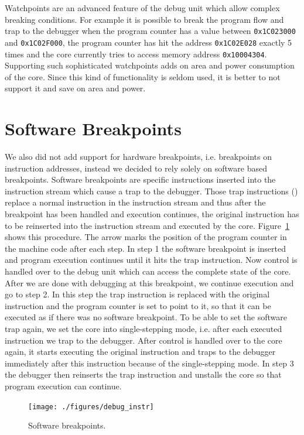 Watchpoints are an advanced feature of the debug unit which allow complex
breaking conditions. For example it is possible to break the program flow and
trap to the debugger when the program counter has a value between \texttt{0x1C023000} and
\texttt{0x1C02F000}, the program counter has hit the address \texttt{0x1C02E028}
exactly 5 times and the core currently tries to access memory address
\texttt{0x10004304}.
Supporting such sophisticated watchpoints adds on area and power consumption of
the core. Since this kind of functionality is seldom used, it is better to not
support it and save on area and power.


\section{Software Breakpoints}

We also did not add support for hardware breakpoints, i.e. breakpoints on
instruction addresses, instead we decided to rely solely on software based
breakpoints. Software breakpoints are specific instructions inserted into the
instruction stream which cause a trap to the debugger. Those trap instructions
() replace a normal instruction in the instruction stream and thus
after the breakpoint has been handled and execution continues, the original
instruction has to be reinserted into the instruction stream and executed by the
core. Figure~\ref{fig:debug_instr} shows this procedure. The arrow marks
the position of the program counter in the machine code after each step.
In step 1 the software breakpoint is inserted and program execution continues
until it hits the trap instruction. Now control is handled over to the debug
unit which can access the complete state of the core.
After we are done with debugging at this breakpoint, we continue execution and
go to step 2. In this step the trap instruction is replaced with the original
instruction and the program counter is set to point to it, so that it can be
executed as if there was no software breakpoint. To be able to set the software
trap again, we set the core into single-stepping mode, i.e. after each
executed instruction we trap to the debugger.
After control is handled over to the core again, it starts executing the
original instruction and traps to the debugger immediately after this
instruction because of the single-stepping mode.
In step 3 the debugger then reinserts the trap instruction and unstalls the core
so that program execution can continue.

\begin{figure}[htbp]
  \centering
  \texttt{[image: ./figures/debug\_instr]}
  \caption{Software breakpoints.}
  \label{fig:debug_instr}
\end{figure}

